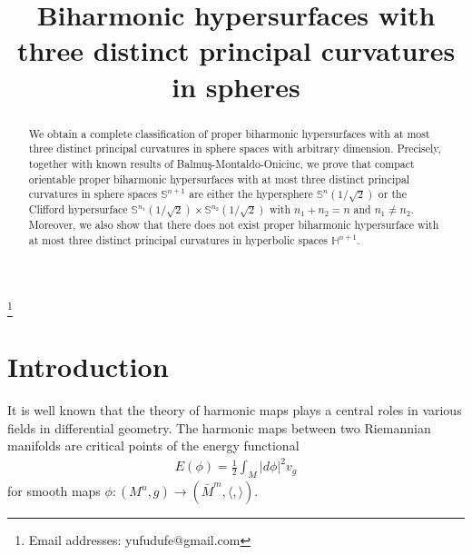 \documentclass[twoside,reqno,A4]{amsart}
\theoremstyle{definition}
\theoremstyle{remark}
\numberwithin{equation}{section}
\begin{document}
 
\title{Biharmonic hypersurfaces with three distinct principal curvatures in spheres}
\thanks{Email addresses: yufudufe@gmail.com}
 


\begin{abstract}
We obtain a complete classification of proper biharmonic
hypersurfaces with at most three distinct principal curvatures in
sphere spaces with arbitrary dimension. Precisely, together with
known results of Balmu\c{s}-Montaldo-Oniciuc, we prove that compact
orientable proper biharmonic hypersurfaces with at most three
distinct principal curvatures in sphere spaces $\mathbb S^{n+1}$ are
either the hypersphere $\mathbb S^n(1/\sqrt2)$ or the Clifford
hypersurface $\mathbb S^{n_1}(1/\sqrt2)\times\mathbb
S^{n_2}(1/\sqrt2)$ with $n_1+n_2=n$ and $n_1\neq n_2$. Moreover, we
also show that there does not exist proper biharmonic hypersurface
with at most three distinct principal curvatures in hyperbolic
spaces $\mathbb H^{n+1}$.
\end{abstract}

\maketitle
{}
\thispagestyle{empty}

\section{Introduction}
\hspace*{\parindent}
It is well known that the theory of harmonic maps plays a central
roles in various fields in differential geometry. The harmonic maps
between two Riemannian manifolds are critical points of the energy
functional
\begin{eqnarray*}
E(\phi)=\frac{1}{2}\int_M|d\phi|^2v_g
\end{eqnarray*}
for smooth maps $\phi:
(M^n,g)\longrightarrow(\bar{M}^m,\langle,\rangle)$.
\end{document}
